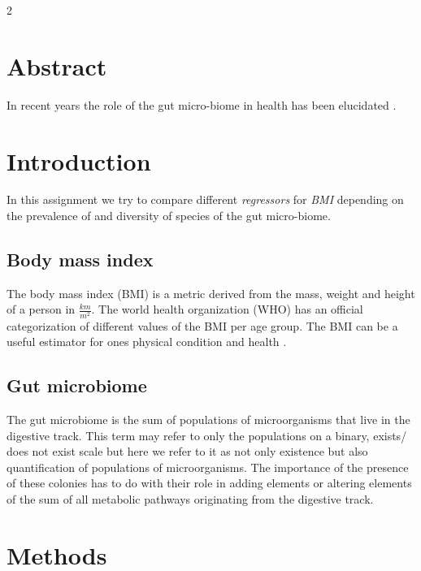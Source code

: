\documentclass[12pt, a4paper]{article}
\begin{document}
\begin{multicols}{2}
    \section*{Abstract} \label{sec:abs}

    In recent years the role of the gut micro-biome in health has been elucidated \cite{ross_interplay_2024}.
    \newline

    \section{Introduction} \label{sec:intro}

    In this assignment we try to compare different \textit{regressors} for \textit{BMI} depending on the prevalence of and diversity of species of the gut micro-biome.
    \newline

    \subsection{Body mass index} \label{subsec:bmi}

    The body mass index (BMI) is a metric derived from the mass, weight and height of a person in $\frac{km}{m^2}$. The world health organization (WHO) \cite{noauthor_world_nodate} has an official categorization of different values of the BMI per age group. The BMI can be a useful estimator for ones physical condition and health \cite{armet_rethinking_2022}.
    \newline

    \subsection{Gut microbiome} \label{subsec:micro}

    The gut microbiome is the sum of populations of microorganisms that live in the digestive track. This term may refer to only the populations on a binary, exists/ does not exist scale but here we refer to it as not only existence but also quantification of populations of microorganisms. The importance of the presence of these colonies has to do with their role in adding elements or altering elements of the sum of all metabolic pathways originating from the digestive track.
    \newline

    \section{Methods} \label{sec:methods}


\end{multicols}
\end{document}
